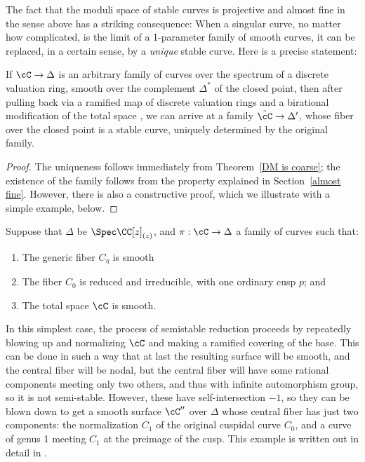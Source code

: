 The fact that the moduli space of stable curves is projective and almost fine in the sense above has a striking consequence: When a singular curve, no matter how complicated, is the limit of a 1-parameter family of smooth curves, it can be replaced, in a certain sense, by a \emph{unique} stable curve. Here is a precise statement:

\begin{theorem}
If $\cC \to \Delta$ is an arbitrary family of curves over the spectrum of a discrete valuation ring, smooth over the complement $\Delta^*$ of the closed point, then after pulling back via a ramified map of
discrete valuation rings and a birational modification of the total space , we can arrive at a family $\tilde \cC \to \Delta'$, whose fiber over the closed point is a stable curve, uniquely determined by the original family.
\end{theorem}

\begin{proof} The uniqueness follows immediately from Theorem~\ref{DM is coarse}; the existence of the family follows from the property explained in Section~\ref{almost fine}. However, there is also a constructive proof, which we  illustrate with a simple example, below.
\end{proof}

\begin{example}
Suppose that 
$\Delta$ be $\Spec \CC[z]_{(z)}$, and $\pi : \cC \to \Delta$ a family of curves such that:
\begin{enumerate}
\item The generic fiber $C_\eta$ is smooth
\item The fiber $C_0$ is reduced and irreducible, with one ordinary cusp $p$; and
\item The total space $\cC$ is smooth.
\end{enumerate}
In this simplest case, the process of semistable reduction proceeds by repeatedly  blowing up and normalizing $\cC$
and  making a ramified
covering of the base. This can be done in such a way that at last
the resulting surface will be smooth, and the central fiber will be nodal, but the  central 
fiber will have some rational components meeting only
two others, and thus with infinite automorphism group, so it is not semi-stable. 
However, these have self-intersection $-1$,
so they can be blown down to get a smooth surface $\cC''$ over $\Delta$ whose central fiber has just two components:
the normalization $C_1$ of the original cuspidal curve $C_0$, and a curve of genus 1 meeting $C_1$ at the preimage
of the cusp.
This example is written out in detail in \cite[pp. 122-128]{MR1631825}.%
\end{example}


